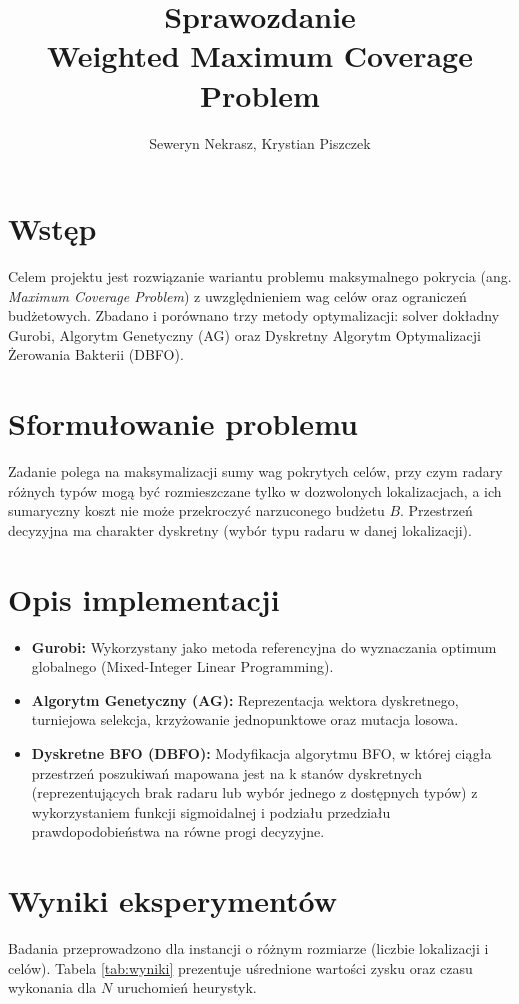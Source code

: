 \documentclass[11pt, a4paper]{article}
\title{\vspace{-1.5cm}\textbf{Sprawozdanie \\
Weighted Maximum Coverage Problem}}
\author{Seweryn Nekrasz, Krystian Piszczek}
\begin{document}
\maketitle
\vspace{-1cm}

\section{Wstęp}
Celem projektu jest rozwiązanie wariantu problemu maksymalnego pokrycia (ang. \textit{Maximum Coverage Problem}) z uwzględnieniem wag celów oraz ograniczeń budżetowych. Zbadano i porównano trzy metody optymalizacji: solver dokładny Gurobi, Algorytm Genetyczny (AG) oraz Dyskretny Algorytm Optymalizacji Żerowania Bakterii (DBFO). 

\section{Sformułowanie problemu}
Zadanie polega na maksymalizacji sumy wag pokrytych celów, przy czym radary różnych typów mogą być rozmieszczane tylko w dozwolonych lokalizacjach, a ich sumaryczny koszt nie może przekroczyć narzuconego budżetu $B$. Przestrzeń decyzyjna ma charakter dyskretny (wybór typu radaru w danej lokalizacji).

\section{Opis implementacji}
\begin{itemize}
    \item \textbf{Gurobi:} Wykorzystany jako metoda referencyjna do wyznaczania optimum globalnego (Mixed-Integer Linear Programming).
    \item \textbf{Algorytm Genetyczny (AG):} Reprezentacja wektora dyskretnego, turniejowa selekcja, krzyżowanie jednopunktowe oraz mutacja losowa.
    \item \textbf{Dyskretne BFO (DBFO):} Modyfikacja algorytmu BFO, w której ciągła przestrzeń poszukiwań mapowana jest na k stanów dyskretnych (reprezentujących brak radaru lub wybór jednego z dostępnych typów) z wykorzystaniem funkcji sigmoidalnej i podziału przedziału prawdopodobieństwa na równe progi decyzyjne.
\end{itemize}

\section{Wyniki eksperymentów}
Badania przeprowadzono dla instancji o różnym rozmiarze (liczbie lokalizacji i celów). Tabela \ref{tab:wyniki} prezentuje uśrednione wartości zysku oraz czasu wykonania dla $N$ uruchomień heurystyk.
\end{document}
